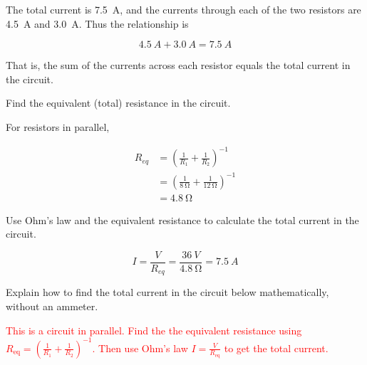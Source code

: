 \documentclass[answers]{exam}
\begin{document}
\begin{questions}
\begin{parts}
\begin{solution}
The total current is \SI{7.5}{A}, and the currents through each of the two resistors are \SI{4.5}{A} and \SI{3.0}{A}. Thus the relationship is

\begin{equation*}
    \SI{4.5}{A} + \SI{3.0}{A} = \SI{7.5}{A}
\end{equation*}

That is, the sum of the currents across each resistor equals the total current in the circuit.
\end{solution}
\end{parts}


\question
Find the equivalent (total) resistance in the circuit. 

\begin{solutionorbox}[2cm]
For resistors in parallel,

\begin{align*}
    R_{eq} &= \left(\frac{1}{R_1} + \frac{1}{R_2}\right)^{-1} \\[1ex]
    &= \left(\frac{1}{\SI{8}{\ohm}} + \frac{1}{\SI{12}{\ohm}}\right)^{-1} \\[1ex]
    &= \boxed{\SI{4.8}{\ohm}}
\end{align*}
\end{solutionorbox}

\question \label{U0ui2}
Use Ohm's law and the equivalent resistance to calculate the total current in the circuit.

\begin{solutionorbox}[2cm]
\begin{equation*}
    I = \frac{V}{R_{eq}} = \frac{\SI{36}{V}}{\SI{4.8}{\ohm}} = \boxed{\SI{7.5}{A}}
\end{equation*}
\end{solutionorbox}

\question
Explain how to find the total current in the circuit below mathematically, without an ammeter.

\begin{EnvUplevel}
\centering
\begin{minipage}{6.5cm}
\centering
{}
\end{minipage}%
\begin{minipage}{9cm}
\ifprintanswers 
\textcolor{red}{This is a circuit in parallel. Find the the equivalent resistance using $R_\mathrm{eq} = \left(\frac{1}{R_1} + \frac{1}{R_2}\right)^{-1}$. Then use Ohm's law $I = \frac{V}{R_\mathrm{eq}}$ to get the total current.}
\else 
\fillwithlines{35mm} 
\fi
\end{minipage}
\end{EnvUplevel}
\end{questions}
\end{document}
